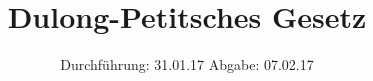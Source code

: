 

\subject{V201}
\title{Dulong-Petitsches Gesetz}
\date{
  Durchführung: 31.01.17
  \hspace{3em}
  Abgabe: 07.02.17
}



\maketitle
\thispagestyle{empty}
\tableofcontents
\newpage






\printbibliography


